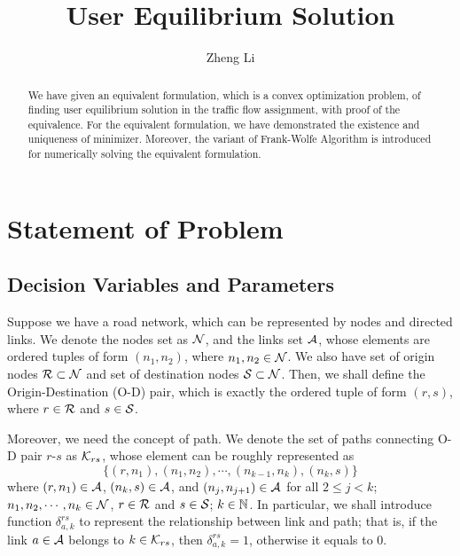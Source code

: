 \documentclass{article}
\title{User Equilibrium Solution}
\author{Zheng Li}
\begin{document}
\maketitle

\tableofcontents

\begin{abstract}
    We have given an equivalent formulation, which is a convex optimization problem, of finding user equilibrium solution in the traffic flow assignment, with proof of the equivalence. For the equivalent formulation, we have demonstrated the existence and uniqueness of minimizer. Moreover, the variant of Frank-Wolfe Algorithm is introduced for numerically solving the equivalent formulation.
\end{abstract}

\section{Statement of Problem}

\subsection{Decision Variables and Parameters}

Suppose we have a road network, which can be represented by nodes and directed links. We denote the nodes set as $ \mathcal{N} $, and the links set $ \mathcal{A} $, whose elements are ordered tuples of form $ (n_1, n_2) $, where $ n_1, n_2 \in \mathcal{N} $. We also have set of origin nodes $ \mathcal{R} \subset \mathcal{N} $ and set of destination nodes $ \mathcal{S} \subset \mathcal{N} $. Then, we shall define the Origin-Destination (O-D) pair, which is exactly the ordered tuple of form $ (r, s) $, where $ r \in \mathcal{R} $ and $ s \in \mathcal{S} $.

Moreover, we need the concept of path. We denote the set of paths connecting O-D pair $ r $-$ s $ as $ \mathcal{K}_{rs} $, whose element can be roughly represented as
$$ \{ (r, n_1), (n_1, n_2), \cdots, (n_{k-1}, n_k), (n_k, s) \} $$ 
where $ (r, n_1) \in \mathcal{A} $, $ (n_k, s) \in \mathcal{A} $, and $ (n_j, n_{j+1}) \in \mathcal{A} $ for all $ 2 \le j < k $; $ n_1, n_2, \cdots, n_k \in \mathcal{N} $, $ r \in \mathcal{R} $ and $ s \in \mathcal{S} $; $ k \in \mathbb{N} $. In particular, we shall introduce function $ \delta_{a, k}^{rs} $ to represent the relationship between link and path; that is, if the link $ a \in \mathcal{A} $ belongs to $ k \in \mathcal{K}_{rs} $, then $ \delta_{a, k}^{rs} = 1 $, otherwise it equals to $ 0 $.
\end{document}
